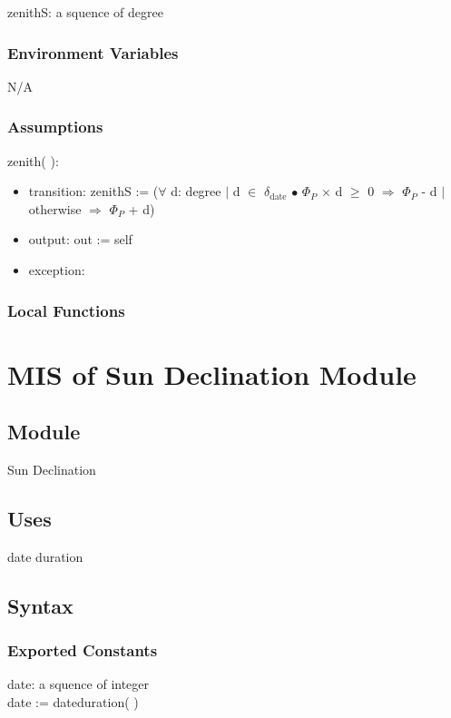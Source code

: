 \documentclass[12pt, titlepage]{article}
\begin{document}
zenithS: a squence of degree


\subsubsection{Environment Variables}

N/A

\subsubsection{Assumptions}




\noindent {}zenith( ):
\begin{itemize}
\item transition: zenithS := ($\forall$ d: degree $|$ d $\in$ $\delta_{\text{date}}$ $\bullet$ $\Phi_{P}$ $\times$ d $\geq$ 0 $\Rightarrow$ $\Phi_{P}$ - d $|$ otherwise $\Rightarrow$ $\Phi_{P}$ + d)

\item output: out := self
\item exception: 
\end{itemize}



\subsubsection{Local Functions}


\newpage

\section{MIS of Sun Declination Module} \label{ModuleSD} 

\subsection{Module}
Sun Declination


\subsection{Uses}
date duration


\subsection{Syntax}

\subsubsection{Exported Constants}
date: a squence of integer\\
date := dateduration( )
\end{document}
